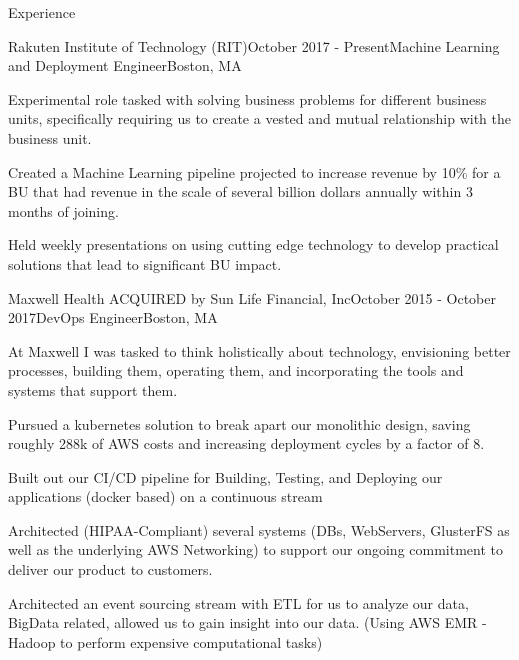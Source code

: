 \documentclass{resume} %
\begin{document}
\begin{rSection}{Experience}


\begin{rSubsection}{Rakuten Institute of Technology (RIT)}{October 2017 - Present}{Machine Learning and Deployment Engineer}{Boston, MA}
 	      \item Experimental role tasked with solving business problems for different business units, specifically requiring us to create a vested and mutual relationship with the business unit.
	  \item Created a Machine Learning pipeline projected to increase revenue by 10\% for a BU that had revenue in the scale of several billion dollars annually within 3 months of joining.       
          \item Held weekly presentations on using cutting edge technology to develop practical solutions that lead to significant BU impact. 
\end{rSubsection}

 

\begin{rSubsection}{Maxwell Health ACQUIRED by Sun Life Financial, Inc}{October 2015 - October 2017}{DevOps Engineer}{Boston, MA}
\item At Maxwell I was tasked to think holistically about technology, envisioning better processes, building them, operating them, and incorporating the tools and systems that support them.
\item Pursued a kubernetes solution to break apart our monolithic design, saving roughly 288k of AWS costs and increasing deployment cycles by a factor of 8. 
\item Built out our CI/CD pipeline for Building, Testing, and Deploying our applications (docker based) on a continuous stream
\item Architected (HIPAA-Compliant) several systems (DBs, WebServers, GlusterFS as well as the underlying AWS Networking) to support our ongoing commitment to deliver our product to customers.
\item Architected an event sourcing stream with ETL for us to analyze our data, BigData related, allowed us to gain insight into our data. (Using AWS EMR - Hadoop to perform expensive computational tasks)
\end{rSubsection}



\end{rSection}
\end{document}
